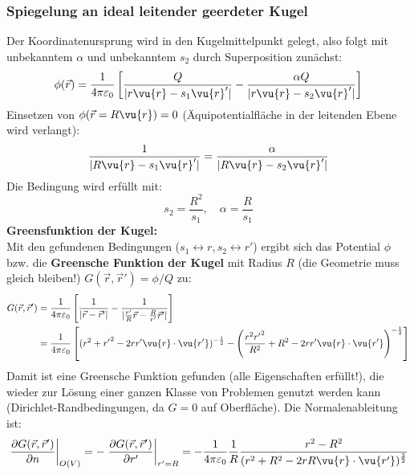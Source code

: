   \subsubsection{Spiegelung an ideal leitender geerdeter Kugel}
	  \begin{center}
		  
	  \end{center}
		  Der Koordinatenursprung wird in den Kugelmittelpunkt gelegt, also folgt mit unbekanntem $\alpha$ und unbekanntem $s_2$ durch Superposition zunächst:
		        $$
			        \phi(\vec{r} ) = \frac{1}{4\pi\varepsilon_0} \left[ \frac{Q}{|r\vu{r}-s_1\vu{r}'|}  - \frac{\alpha Q}{|r\vu{r}-s_2\vu{r}'|}   \right]
		        $$
		   Einsetzen von $\phi(\vec{r}  = R\vu{r})= 0$ (Äquipotentialfläche in der leitenden Ebene wird verlangt):
		        $$
			        \frac{1}{|R\vu{r}-s_1\vu{r}'|}  = \frac{\alpha }{|R\vu{r}-s_2\vu{r}'|}
		        $$
		   Die Bedingung wird erfüllt mit:
		        \begin{equation}
			        \boxed{s_2 = \frac{R^2}{s_1}, \quad \alpha = \frac{R}{s_1}}
		        \end{equation}
	  \textbf{Greensfunktion der Kugel:}\\
			   Mit den gefundenen Bedingungen ($s_1\leftrightarrow r, s_2\leftrightarrow r'$) ergibt sich das Potential $\phi$ bzw. die \textbf{Greensche Funktion der Kugel} mit Radius $R$ (die Geometrie muss gleich bleiben!) $G(\vec{r} ,\vec{r}' ) = \phi/Q$ zu:
			        \begin{equation}\begin{split}
					        G(\vec{r} ,\vec{r}' ) & = \frac{1}{4\pi\varepsilon_0} \left[ \frac{1}{|\vec{r}  - \vec{r}' |}  -  \frac{1}{|\frac{r'}{R}\vec{r}  - \frac{R}{r'}\vec{r}' |} \right] \\
					        & = \frac{1}{4\pi\varepsilon_0} \left[  ( r^2+{r'}^2-2rr'\vu{r}\cdot \vu{r'})^{-\frac{1}{2}}   - \left( \frac{r^2{r'}^2}{R^2}+R^2-2rr'\vu{r}\cdot \vu{r'}  \right)^{-\frac{1}{2}} \right]
				        \end{split}\end{equation}
				Damit ist eine Greensche Funktion gefunden (alle Eigenschaften erfüllt!), die wieder zur Lösung einer ganzen Klasse von Problemen genutzt werden kann (Dirichlet-Randbedingungen, da $G=0$ auf Oberfläche). Die Normalenableitung ist:
			        \begin{equation}\begin{split}
					        \left. \frac{ \partial G(\vec{r} ,\vec{r}' ) }{ \partial n } \right|_{O(V)} =  - \left. \frac{ \partial G(\vec{r} ,\vec{r}' ) }{ \partial r' }\right|_{r'=R}  = - \frac{1}{4\pi\varepsilon_0} \frac{1}{R} \frac{ r^2-R^2 }{ (r^2+R^2-2rR \vu{r}\cdot \vu{r'})^{\frac{3}{2}} }
				        \end{split}\end{equation}
